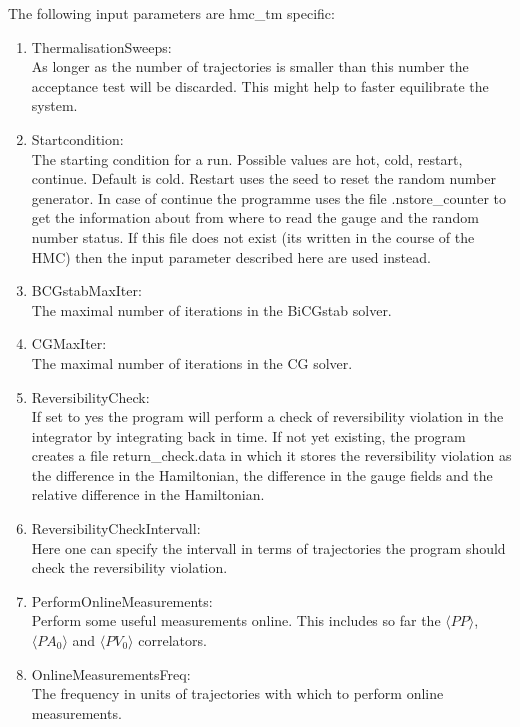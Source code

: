 The following input parameters are {\ttfamily hmc\_tm} specific:
\begin{enumerate}
\item {ThermalisationSweeps}:\\
  As longer as the number of trajectories is smaller than this number
  the acceptance test will be discarded. This might help to faster
  equilibrate the system.

\item {\ttfamily Startcondition}:\\
  The starting condition for a run. Possible values are {\ttfamily
    hot, cold, restart, continue}. Default is {\ttfamily
    cold}. Restart uses the seed to reset the random number
  generator. In case of {\ttfamily continue} the programme uses the
  file {\ttfamily .nstore\_counter} to get the information about from
  where to read the gauge and the random number status. If this file
  does not exist (its written in the course of the HMC) then the input
  parameter described here are used instead.

\item {\ttfamily BCGstabMaxIter}:\\
  The maximal number of iterations in the BiCGstab solver.

\item {\ttfamily CGMaxIter}:\\
  The maximal number of iterations in the CG solver.

\item {\ttfamily ReversibilityCheck}:\\
  If set to {\ttfamily yes} the program will perform a check of
  reversibility violation in the integrator by integrating back in
  time. If not yet existing, the program creates a file {\ttfamily
    return\_check.data} in which it stores the reversibility violation
  as the difference in the Hamiltonian, the difference in the gauge
  fields and the relative difference in the Hamiltonian.

\item {\ttfamily ReversibilityCheckIntervall}:\\
  Here one can specify the intervall in terms of trajectories the
  program should check the reversibility violation.

\item {\ttfamily PerformOnlineMeasurements}:\\
  Perform some useful measurements online. This includes so far the
  $\langle PP\rangle$, $\langle PA_0\rangle$ and $\langle PV_0\rangle$
  correlators.

\item {\ttfamily OnlineMeasurementsFreq}:\\
  The frequency in units of trajectories with which to perform online
  measurements. 
 
\end{enumerate}
